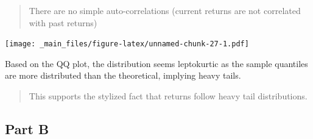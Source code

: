\documentclass[
  oneside]{book}
\newenvironment{Shaded}{\begin{snugshade}}{\end{snugshade}}
\newcommand{\AttributeTok}[1]{\textcolor[rgb]{0.77,0.63,0.00}{#1}}
\newcommand{\ConstantTok}[1]{\textcolor[rgb]{0.00,0.00,0.00}{#1}}
\newcommand{\DecValTok}[1]{\textcolor[rgb]{0.00,0.00,0.81}{#1}}
\newcommand{\FunctionTok}[1]{\textcolor[rgb]{0.00,0.00,0.00}{#1}}
\newcommand{\NormalTok}[1]{#1}
\newcommand{\OtherTok}[1]{\textcolor[rgb]{0.56,0.35,0.01}{#1}}
\newcommand{\SpecialCharTok}[1]{\textcolor[rgb]{0.00,0.00,0.00}{#1}}
\newcommand{\StringTok}[1]{\textcolor[rgb]{0.31,0.60,0.02}{#1}}
\begin{document}
\begin{quote}
There are no simple auto-correlations (current returns are not correlated with past returns)
\end{quote}

\begin{Shaded}
\end{Shaded}

\texttt{[image: \_main\_files/figure-latex/unnamed-chunk-27-1.pdf]}

Based on the QQ plot, the distribution seems leptokurtic as the sample quantiles are more distributed than the theoretical, implying heavy tails.

\begin{quote}
This supports the stylized fact that returns follow heavy tail distributions.
\end{quote}

\hypertarget{part-b-1}{%
\subsection{Part B}\label{part-b-1}}

\begin{Shaded}
\end{Shaded}
\end{document}
